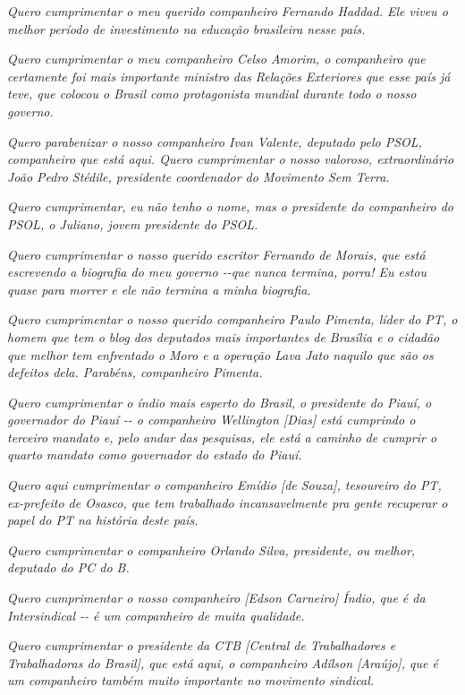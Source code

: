 \emph{Quero cumprimentar o meu querido companheiro Fernando Haddad. Ele
viveu o melhor período de investimento na educação brasileira nesse
país.}

\emph{Quero cumprimentar o meu companheiro Celso Amorim, o companheiro
que certamente foi mais importante ministro das Relações Exteriores que
esse país já teve, que colocou o Brasil como protagonista mundial
durante todo o nosso governo.~}

\emph{Quero parabenizar o nosso companheiro Ivan Valente, deputado pelo
PSOL, companheiro que está aqui. Quero cumprimentar o nosso valoroso,
extraordinário João Pedro Stédile, presidente coordenador do Movimento
Sem Terra.~}

\emph{Quero cumprimentar, eu não tenho o nome, mas o presidente do
companheiro do PSOL, o Juliano, jovem presidente do PSOL.}

\emph{Quero cumprimentar o nosso querido escritor Fernando de Morais,
que está escrevendo a biografia do meu governo -\/-que nunca termina,
porra! Eu estou quase para morrer e ele não termina a minha biografia.~}

\emph{Quero cumprimentar o nosso querido companheiro Paulo Pimenta,
líder do PT, o homem que tem o blog dos deputados mais importantes de
Brasília e o cidadão que melhor tem enfrentado o Moro e a operação Lava
Jato naquilo que são os defeitos dela. Parabéns, companheiro Pimenta.~}

\emph{Quero cumprimentar o índio mais esperto do Brasil, o presidente do
Piauí, o governador do Piauí -\/- o companheiro Wellington {[}Dias{]}
está cumprindo o terceiro mandato e, pelo andar das pesquisas, ele está
a caminho de cumprir o quarto mandato como governador do estado do
Piauí.~}

\emph{Quero aqui cumprimentar o companheiro Emídio {[}de Souza{]},
tesoureiro do PT, ex-prefeito de Osasco, que tem trabalhado
incansavelmente pra gente recuperar o papel do PT na história deste
país.~}

\emph{Quero cumprimentar o companheiro Orlando Silva, presidente, ou
melhor, deputado do PC do B.~}

\emph{Quero cumprimentar o nosso companheiro {[}Edson Carneiro{]} Índio,
que é da Intersindical -\/- é um companheiro de muita qualidade.~}

\emph{Quero cumprimentar o presidente da CTB {[}Central de Trabalhadores
e Trabalhadoras do Brasil{]}, que está aqui, o companheiro Adílson
{[}Araújo{]}, que é um companheiro também muito importante no movimento
sindical.~}

